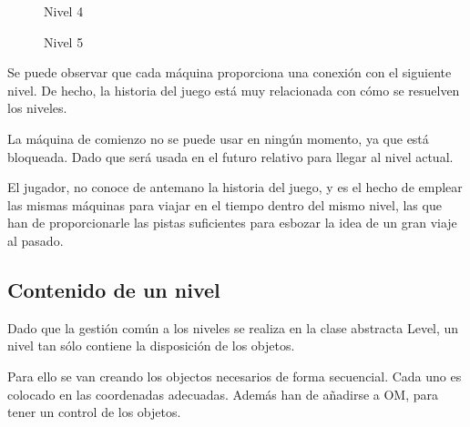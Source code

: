 \documentclass[11pt,a4paper]{article}
\begin{document}
\begin{figure}[H]
\centering
{}
\caption{Nivel 4}
\label{fig:level4}
\end{figure}

\begin{figure}[H]
\centering
{}
\caption{Nivel 5}
\label{fig:level5}
\end{figure}

Se puede observar que cada máquina proporciona una conexión con el siguiente 
nivel. De hecho, la historia del juego está muy relacionada con cómo se 
resuelven los niveles.

La máquina de comienzo no se puede usar en ningún momento, ya que está 
bloqueada. Dado que será usada en el futuro relativo para llegar al nivel 
actual.

El jugador, no conoce de antemano la historia del juego, y es el hecho de 
emplear las mismas máquinas para viajar en el tiempo dentro del mismo nivel, las 
que han de proporcionarle las pistas suficientes para esbozar la idea de un gran 
viaje al pasado.

\subsection{Contenido de un nivel}
Dado que la gestión común a los niveles se realiza en la clase abstracta Level, 
un nivel tan sólo contiene la disposición de los objetos.

Para ello se van creando los objectos necesarios de forma secuencial. Cada uno 
es colocado en las coordenadas adecuadas. Además han de añadirse a OM, para 
tener un control de los objetos.
\end{document}
